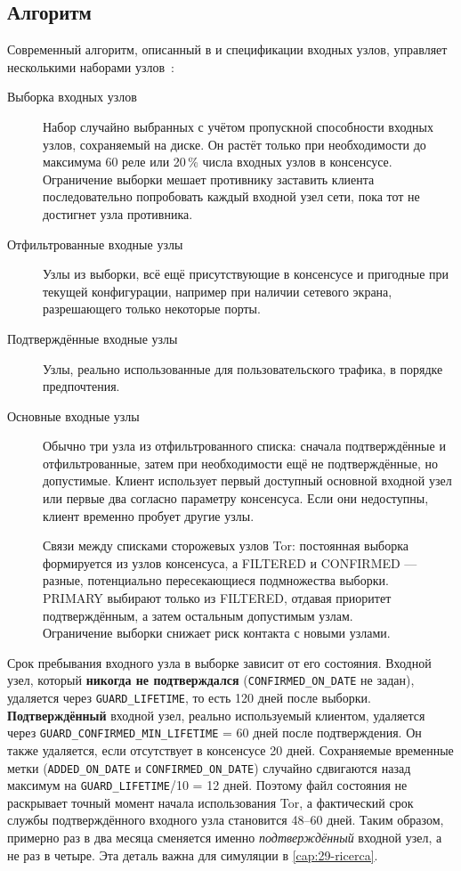 \subsection{Алгоритм}

Современный алгоритм, описанный в  и спецификации входных узлов, управляет несколькими наборами узлов~:
\begin{description}
  \item[Выборка входных узлов] Набор случайно выбранных с учётом пропускной способности входных узлов, сохраняемый на диске. Он растёт только при необходимости до максимума 60 реле или 20\,\% числа входных узлов в консенсусе. Ограничение выборки мешает противнику заставить клиента последовательно попробовать каждый входной узел сети, пока тот не достигнет узла противника.
  \item[Отфильтрованные входные узлы] Узлы из выборки, всё ещё присутствующие в консенсусе и пригодные при текущей конфигурации, например при наличии сетевого экрана, разрешающего только некоторые порты.
  \item[Подтверждённые входные узлы] Узлы, реально использованные для пользовательского трафика, в порядке предпочтения.
  \item[Основные входные узлы] Обычно три узла из отфильтрованного списка: сначала подтверждённые и отфильтрованные, затем при необходимости ещё не подтверждённые, но допустимые. Клиент использует первый доступный основной входной узел или первые два согласно параметру консенсуса. Если они недоступны, клиент временно пробует другие узлы.
\end{description}
\begin{figure}[htbp]
\centering

\caption{Связи между списками сторожевых узлов Tor: постоянная выборка формируется из узлов консенсуса, а FILTERED и CONFIRMED — разные, потенциально пересекающиеся подмножества выборки. PRIMARY выбирают только из FILTERED, отдавая приоритет подтверждённым, а затем остальным допустимым узлам. Ограничение выборки снижает риск контакта с новыми узлами.}
\label{fig:guard}
\end{figure}

Срок пребывания входного узла в выборке зависит от его состояния. Входной узел, который \textbf{никогда не подтверждался} (\texttt{CONFIRMED\_ON\_DATE} не задан), удаляется через \texttt{GUARD\_LIFETIME}, то есть 120 дней после выборки. \textbf{Подтверждённый} входной узел, реально используемый клиентом, удаляется через \texttt{GUARD\_CONFIRMED\_MIN\_LIFETIME} = 60 дней после подтверждения. Он также удаляется, если отсутствует в консенсусе 20 дней. Сохраняемые временные метки (\texttt{ADDED\_ON\_DATE} и \texttt{CONFIRMED\_ON\_DATE}) случайно сдвигаются назад максимум на \texttt{GUARD\_LIFETIME}/10 = 12 дней. Поэтому файл состояния не раскрывает точный момент начала использования Tor, а фактический срок службы подтверждённого входного узла становится 48--60 дней. Таким образом, примерно раз в два месяца сменяется именно \emph{подтверждённый} входной узел, а не раз в четыре. Эта деталь важна для симуляции в \cref{cap:29-ricerca}.

